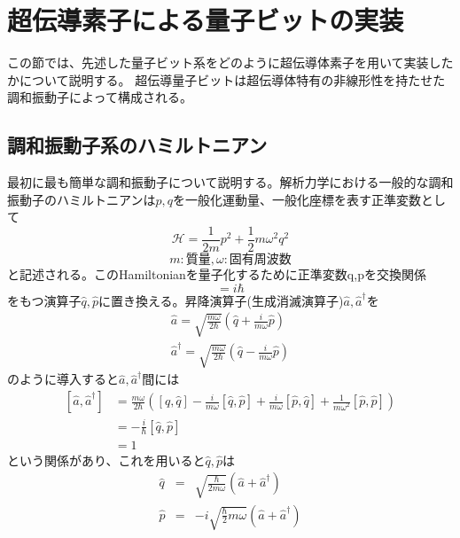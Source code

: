     \section{超伝導素子による量子ビットの実装}
    この節では、先述した量子ビット系をどのように超伝導体素子を用いて実装したかについて説明する。
    超伝導量子ビットは超伝導体特有の非線形性を持たせた調和振動子によって構成される。
        \subsection{調和振動子系のハミルトニアン}
        最初に最も簡単な調和振動子について説明する。解析力学における一般的な調和振動子のハミルトニアンは$p,q$を一般化運動量、一般化座標を表す正準変数として
        \begin{equation}
            \mathcal{H}=\frac{1}{2m}p^2+\frac{1}{2}m\omega^2 q^2
        \end{equation}
        \begin{equation*}
            m:\mathrm{質量},\omega:\mathrm{固有周波数}
        \end{equation*}
        と記述される。このHamiltonianを量子化するために正準変数q,pを交換関係
        \begin{equation}
            [\hat{q},\hat{p}]=i\hbar
        \end{equation}
        をもつ演算子$\hat{q},\hat{p}$に置き換える。昇降演算子(生成消滅演算子)$\hat{a},\hat{a}^\dagger$を
        \begin{eqnarray}
            \hat{a}=\sqrt{\frac{m\omega}{2\hbar}}(\hat{q}+\frac{i}{m\omega}\hat{p})\\
            \hat{a}^\dagger=\sqrt{\frac{m\omega}{2\hbar}}(\hat{q}-\frac{i}{m\omega}\hat{p})
        \end{eqnarray}
        のように導入すると$\hat{a},\hat{a}^\dagger$間には
        \begin{equation}
        \begin{split}
            [\hat{a},\hat{a}^\dagger]&=\frac{m\omega}{2\hbar}([\hat{q},\hat{q}]-\frac{i}{m\omega}[\hat{q},\hat{p}]+\frac{i}{m\omega}[\hat{p},\hat{q}]+\frac{1}{m\omega^2}[\hat{p},\hat{p}])\\
            &=-\frac{i}{\hbar}[\hat{q},\hat{p}]\\
            &=1
        \end{split}
        \end{equation}
        という関係があり、これを用いると$\hat{q},\hat{p}$は
        \begin{eqnarray}
            \hat{q}&=&\sqrt{\frac{\hbar}{2m\omega}}(\hat{a}+\hat{a}^\dagger)\\
            \hat{p}&=&-i\sqrt{\frac{\hbar}{2}m\omega}(\hat{a}+\hat{a}^\dagger)
        \end{eqnarray}
